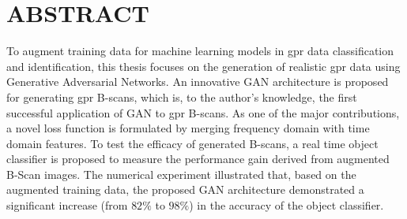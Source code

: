 \singlespacing
\chapter*{ABSTRACT}
\doublespacing
\raggedright
To augment training data for machine learning models in \acrfull{gpr} data classification and identification, this thesis focuses on the generation of realistic \acrshort{gpr} data using Generative Adversarial Networks. An innovative GAN architecture is proposed for generating \acrshort{gpr} B-scans, which is, to the author's knowledge, the first successful application of GAN to \acrshort{gpr} B-scans. As one of the major contributions, a novel loss function is formulated by merging frequency domain with time domain features. To test the efficacy of generated B-scans, a real time object classifier is proposed to measure the performance gain derived from augmented B-Scan images. The numerical experiment illustrated that, based on the augmented training data, the proposed GAN architecture demonstrated a significant increase (from $82\%$ to $98\%$) in the accuracy of the object classifier.